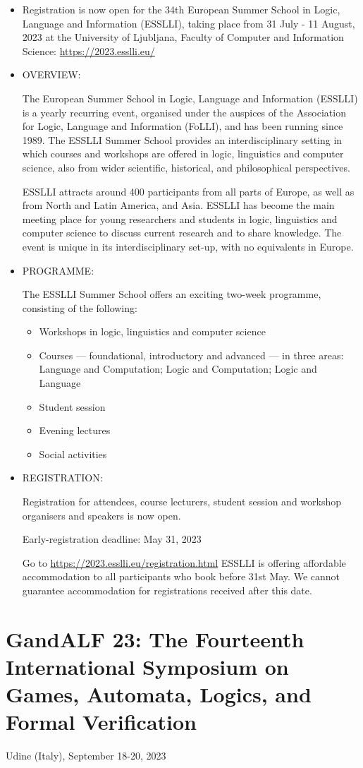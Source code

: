 \documentclass[prodmode,acmtecs]{acmsmall} %
\begin{document}
\begin{itemize}\item  Registration is now open for the 34th European Summer School in Logic, Language and Information (ESSLLI), taking place from 31 July - 11 August, 2023 at the University of Ljubljana, Faculty of Computer and Information Science: \href{https://2023.esslli.eu/}{https://2023.esslli.eu/} 
 
\item  OVERVIEW: 
 
  The European Summer School in Logic, Language and Information (ESSLLI) is a yearly recurring event, organised under the auspices of the Association for Logic, Language and Information (FoLLI), and has been running since 1989. The ESSLLI Summer School provides an interdisciplinary setting in which courses and workshops are offered in logic, linguistics and computer science, also from wider scientific, historical, and philosophical perspectives. 
 
  ESSLLI attracts around 400 participants from all parts of Europe, as well as from North and Latin America, and Asia. ESSLLI has become the main meeting place for young researchers and students in logic, linguistics and computer science to discuss current research and to share knowledge. The event is unique in its interdisciplinary set-up, with no equivalents in Europe.  
 
\item  PROGRAMME: 
 
  The ESSLLI Summer School offers an exciting two-week programme, consisting of the following: 
 
\begin{itemize}\item  Workshops in logic, linguistics and computer science
\item  Courses — foundational, introductory and advanced — in three areas: Language and Computation; Logic and Computation; Logic and Language
\item  Student session
\item  Evening lectures
\item  Social activities 
\end{itemize} 
\item  REGISTRATION: 
 
  Registration for attendees, course lecturers, student session and workshop organisers and speakers is now open.  
 
Early-registration deadline: May 31, 2023 
 
  Go to \href{https://2023.esslli.eu/registration.html}{https://2023.esslli.eu/registration.html} ESSLLI is offering affordable accommodation to all participants who book before 31st May. We cannot guarantee accommodation for registrations received after this date.  
 
\end{itemize}\section{GandALF 23: The Fourteenth International Symposium on Games, Automata, Logics, and Formal Verification}\label{GandALF23}  Udine (Italy), September 18-20, 2023\\ 
\end{document}
